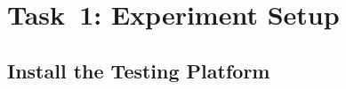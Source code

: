 \documentclass[11pt]{article}
\newcommand{\tor}{{\sf Tor}\xspace}
\newcommand{\darkweb}{{\sf DarkWeb}\xspace}
\begin{document}




\section{Task~1: Experiment Setup}
 


\subsection{Install the Testing Platform}
 
\end{document}
